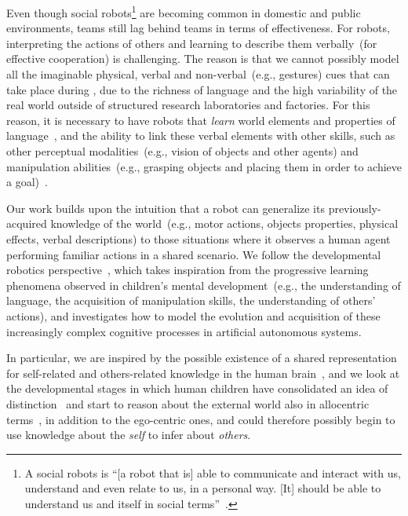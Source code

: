 
Even though social robots\footnote{A social robots is ``[a robot that is] able to communicate and interact with us, understand and even relate to us, in a personal way. [It] should be able to understand us and itself in social terms''~\cite{breazeal:2002:dsr}.} are becoming common in domestic and public environments, \hr{} teams still lag behind \hh{} teams in terms of effectiveness.
For robots, interpreting the actions of others and learning to describe them verbally~(for effective cooperation) is challenging.
The reason is that we cannot possibly model all the imaginable physical, verbal and non-verbal~(e.g., gestures) cues that can take place during \hri, due to the richness of language and the high variability of the real world outside of structured research laboratories and factories.
For this reason, it is necessary to have robots that \emph{learn} world elements and properties of language~\cite{iwahashi:2007:hri}, and the ability to link these verbal elements with other skills, such as other perceptual modalities~(e.g., vision of objects and other agents) and manipulation abilities~(e.g., grasping objects and placing them in order to achieve a goal)~\cite{steels:2003:trendscogsci}.

Our work builds upon the intuition that a robot can generalize its previously-acquired knowledge of the world~(e.g., motor actions, objects properties, physical effects, verbal descriptions) to those situations where it observes a human agent performing familiar actions in a shared \hr{} scenario.
We follow the developmental robotics perspective~\cite{lungarella:2003:devrobsurvey,cangelosi:2015:devrobbook},
which takes inspiration from the progressive learning phenomena observed in children's mental development~(e.g., the understanding of language, the acquisition of manipulation skills, the understanding of others' actions), and investigates how to model the evolution and acquisition of these increasingly complex cognitive processes in artificial autonomous systems.

In particular, we are inspired by the possible existence of a shared representation for self-related and others-related knowledge in the human brain~\cite{rizzolatti:2001:nrn,decety:2003:sharedrep}, and we look at the developmental stages in which human children have consolidated an idea of \selfother{} distinction~\cite{symons:2004:mental} and start to reason about the external world also in allocentric terms~\cite{ribordy:2013:development}, in addition to the ego-centric ones, and could therefore possibly begin to use knowledge about the \emph{self} to infer about \emph{others}.

